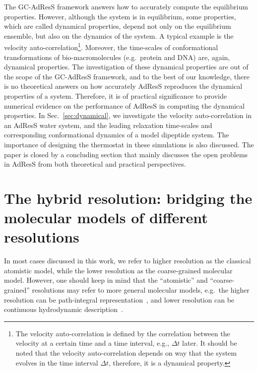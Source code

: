 \documentclass[epjST]{svjour}
\newcommand{\recheck}[1]{{\color{red} #1}}
\begin{document}
The GC-AdResS framework answers how to accurately compute the  equilibrium properties.
However, although the system is in equilibrium,
some properties, which are called dynamical properties,
\recheck{depend not only on the equilibrium ensemble, but also on the dynamics of the system.}
A typical example is the velocity auto-correlation\footnote{
  \recheck{
  The velocity auto-correlation
  is defined by the correlation between the velocity at a certain time and a time interval, e.g., $\Delta t$ later.
  It should be noted that
  the velocity auto-correlation depends on way that the system evolves in the time interval $\Delta t$,
  therefore, it is a dynamical property. }}.
Moreover, the time-scales of conformational transformations
of bio-macromolecules (e.g.~protein and DNA)
are, again, dynamical properties.
The investigation of these  dynamical properties are out of the scope of the GC-AdResS framework,
and to the best of our knowledge, there is no theoretical answers on how accurately  AdResS reproduces the 
dynamical properties of a system.
Therefore, it is of practical significance to  provide numerical
evidence on the performance of AdResS in computing the dynamical properties.
In Sec.~\ref{sec:dynamical}, we investigate the
velocity auto-correlation in an AdResS water system, and the
leading relaxation time-scales and corresponding conformational dynamics of
a model dipeptide system.
The importance of designing the thermostat in these simulations
is also discussed.
The paper is closed by a concluding section
that mainly discusses the open problems in AdResS from both theoretical
and practical perspectives.

\section{The hybrid resolution: bridging the molecular models of different resolutions}
\label{sec:design}

In most cases discussed in this work, we refer to higher resolution as the classical atomistic model, while
the lower resolution as the coarse-grained molecular model. However,
one should keep in mind that the ``atomistic'' and ``coarse-grained'' resolutions
may refer to more general molecular models, e.g.~the higher resolution can be
path-integral representation~\cite{poma2010classical}, and lower resolution can be continuous
hydrodynamic description~\cite{delgado2009coupling}.
\end{document}
